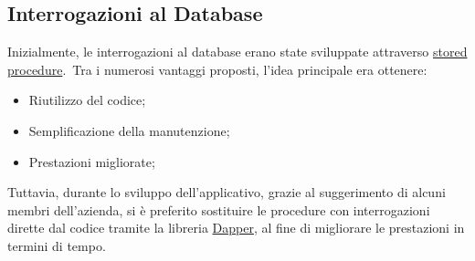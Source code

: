 \subsection{Interrogazioni al Database}
Inizialmente, le interrogazioni al database erano state sviluppate attraverso \href{https://learn.microsoft.com/it-it/sql/relational-databases/stored-procedures/stored-procedures-database-engine?view=sql-server-ver16}{stored 
procedure}.\ Tra i numerosi vantaggi proposti, l'idea principale era ottenere:
\begin{itemize}
	\item Riutilizzo del codice;
	\item Semplificazione della manutenzione;
	\item Prestazioni migliorate;
\end{itemize}
Tuttavia, durante lo sviluppo dell'applicativo, grazie al suggerimento di alcuni membri
dell'azienda, si è preferito sostituire le procedure con interrogazioni dirette dal codice
tramite la libreria \href{https://learn.microsoft.com/it-it/azure/azure-sql/database/elastic-scale-working-with-dapper?view=azuresql}{Dapper}, al fine di migliorare le prestazioni in termini di tempo.

